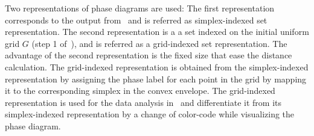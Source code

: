 Two representations of phase diagrams are used:
The first representation corresponds to the output from~ and is referred as simplex-indexed set representation. 
The second representation is a a set indexed on the initial uniform grid $G$ (step 1 of~), and is referred as a grid-indexed set representation.
The advantage of the second representation is the fixed size that ease the distance calculation. 
The grid-indexed representation is obtained from the simplex-indexed representation by assigning the phase label for each point in the grid by mapping it to the corresponding simplex in the convex envelope. 
The grid-indexed representation is used for the data analysis in~ and differentiate it from its simplex-indexed representation by a change of color-code while visualizing the phase diagram.
